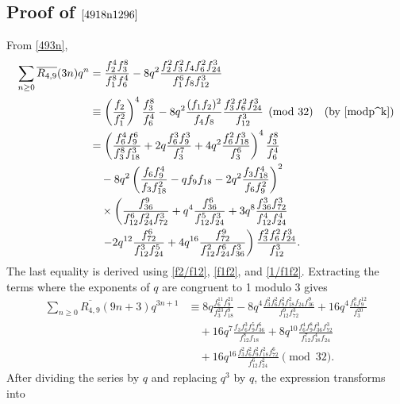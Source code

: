 \documentclass{amsart}
\theoremstyle{definition}
\begin{document}
\subsection*{Proof of $\eqref{4918n1296}$}
From \eqref{493n},
\begin{align*}
\sum_{n \ge 0} \overline{R_{4,9}}(3n) q^n 
		&= \frac{f_2^4 f_3^8}{f_1^8 f_6^4} - 8q^2 \frac{f_2^2 f_3^2 f_4 f_6^2 f_{24}^3}{f_1^6 f_8 f_{12}^3} \\
		&\equiv \left( \frac{f_2}{f_1^2} \right)^4 \frac{f_3^8}{f_6^4} - 8q^2 \frac{(f_1 f_2)^2}{f_4 f_8} \frac{f_3^2 f_6^2 f_{24}^3}{f_{12}^3} \pmod{32} \quad \text{(by \eqref{modp^k})} \\
		&= \left( \frac{f_6^4 f_9^6}{f_3^8 f_{18}^3} + 2q \frac{f_6^3 f_9^3}{f_3^7} + 4q^2 \frac{f_6^2 f_{18}^3}{f_3^6} \right)^4 \frac{f_3^8}{f_6^4} \\
		&\quad - 8q^2 \left( \frac{f_6 f_9^4}{f_3 f_{18}^2} - q f_9 f_{18} - 2q^2 \frac{f_3 f_{18}^4}{f_6 f_9^2} \right)^2 \\
		&\quad \times \left( \frac{f_{36}^9}{f_{12}^6 f_{24}^2 f_{72}^3} + q^4 \frac{f_{36}^6}{f_{12}^5 f_{24}^3} + 3q^8 \frac{f_{36}^3 f_{72}^3}{f_{12}^4 f_{24}^4} \right. \\
		&\quad \left. - 2q^{12} \frac{f_{72}^6}{f_{12}^3 f_{24}^5} + 4q^{16} \frac{f_{72}^9}{f_{12}^2 f_{24}^6 f_{36}^3} \right) \frac{f_3^2 f_6^2 f_{24}^3}{f_{12}^3}.
\end{align*}
The last equality is derived using \eqref{f2/f12}, \eqref{f1f2}, and \eqref{1/f1f2}. Extracting the terms where the exponents of $q$ are congruent to 1 modulo 3 gives
\begin{equation*}
	\begin{aligned}
		\sum_{n \ge 0} \overline{R_{4,9}}(9n+3) q^{3n+1} 
		&\equiv 8q \frac{f_6^{11} f_9^{21}}{f_3^{23} f_{18}^9} - 8q^4 \frac{f_3^2 f_6^2 f_9^2 f_{18}^2 f_{24} f_{36}^9}{f_{12}^9 f_{72}^3} + 16q^4 \frac{f_6^8 f_9^{12}}{f_3^{20}} \\
		&\quad + 16q^7 \frac{f_3 f_6^3 f_9^5 f_{36}^6}{f_{12}^8 f_{18}} + 8q^{10} \frac{f_6^4 f_9^8 f_{36}^3 f_{72}^3}{f_{12}^7 f_{18}^4 f_{24}} \\
		&\quad + 16q^{16} \frac{f_3^2 f_6^2 f_9^2 f_{18}^2 f_{72}^6}{f_{12}^6 f_{24}^2} \pmod{32}.
	\end{aligned}
\end{equation*}
After dividing the series by $q$ and replacing $q^3$ by $q$, the expression transforms into
\end{document}

